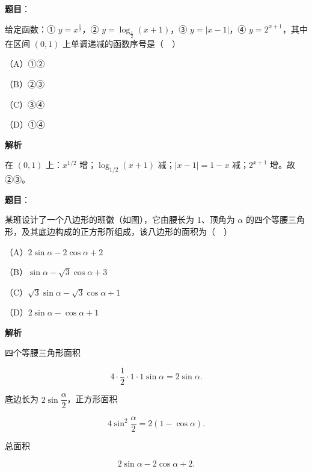 \begin{answer}

\textbf{题目}：

给定函数：① $y=x^{\frac12}$，② $y=\log_{\frac12}(x+1)$，③ $y=|x-1|$，④ $y=2^{x+1}$，其中在区间 $(0,1)$ 上单调递减的函数序号是（　）

（A）①②

（B）②③

（C）③④

（D）①④

\textbf{解析}

在 $(0,1)$ 上：$x^{1/2}$ 增；$\log_{1/2}(x+1)$ 减；$|x-1|=1-x$ 减；$2^{x+1}$ 增。故②③。


\end{answer}
\begin{answer}

\textbf{题目}：

某班设计了一个八边形的班徽（如图），它由腰长为 $1$、顶角为 $\alpha$ 的四个等腰三角形，及其底边构成的正方形所组成，该八边形的面积为（　）

（A）$2\sin\alpha-2\cos\alpha+2$

（B）$\sin\alpha-\sqrt3\cos\alpha+3$

（C）$\sqrt3\sin\alpha-\sqrt3\cos\alpha+1$

（D）$2\sin\alpha-\cos\alpha+1$
\nopagebreak[4]
\begin{center}\end{center}
\nopagebreak[4]
\textbf{解析}

四个等腰三角形面积

\nopagebreak[4]
\[4\cdot\frac12\cdot1\cdot1\sin\alpha=2\sin\alpha.\]

底边长为 $2\sin\dfrac\alpha2$，正方形面积

\nopagebreak[4]
\[4\sin^2\frac\alpha2=2(1-\cos\alpha).\]

总面积

\nopagebreak[4]
\[2\sin\alpha-2\cos\alpha+2.\]


\end{answer}
